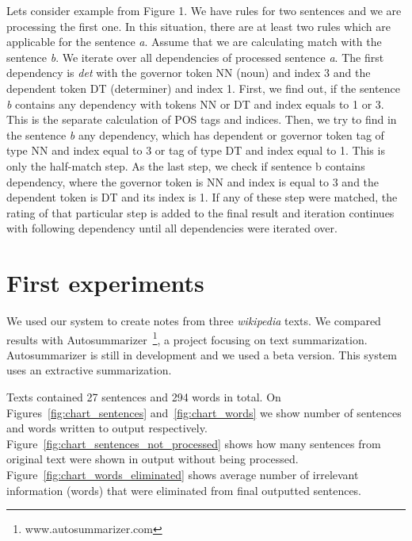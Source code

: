\documentclass{iitsrc}
\begin{document}
		Lets consider example from Figure 1. We have rules for two sentences and we are processing the first one. In this situation, there are at least two rules which are applicable for the sentence \textit{a}. Assume that we are calculating match with the sentence \textit{b}. We iterate over all dependencies of processed sentence \textit{a}. The first dependency is \textit{det} with the governor token NN (noun) and index 3 and the dependent token DT (determiner) and index 1. First, we find out, if the sentence \textit{b} contains any dependency with tokens NN or DT and index equals to 1 or 3. This is the separate calculation of POS tags and indices. Then, we try to find in the sentence \textit{b} any dependency, which has dependent or governor token tag of type NN and index equal to 3 or tag of type DT and index equal to 1. This is only the half-match step. As the last step, we check if sentence b contains dependency, where the governor token is NN and index is equal to 3 and the dependent token is DT and its index is 1. If any of these step were matched, the rating of that particular step is added to the final result and iteration continues with following dependency until all dependencies were iterated over.
\section{First experiments}	\label{evaluation}
	We used our system to create notes from three \textit{wikipedia} texts. We compared results with Autosummarizer~\footnote{www.autosummarizer.com}, a project focusing on text summarization. Autosummarizer is still in development and we used a beta version. This system uses an extractive summarization.

	Texts contained 27 sentences and 294 words in total. On Figures~\ref{fig:chart_sentences} and~\ref{fig:chart_words} we show number of sentences and words written to output respectively. Figure~\ref{fig:chart_sentences_not_processed} shows how many sentences from original text were shown in output without being processed. Figure~\ref{fig:chart_words_eliminated} shows average number of irrelevant information (words) that were eliminated from final outputted sentences.
	
\end{document}
